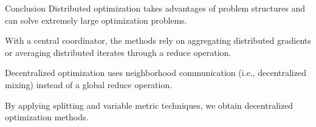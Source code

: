 \documentclass[10pt,mathserif]{beamer}
\begin{document}
\iffalse
\begin{frame}
\frametitle{DIGing}
Let $\overline{W}\in \reals^{n\times n}$ be a mixing matrix. The method
\begin{align*}
  \vx^{k+1} & = \overline{W}\vx^k - \vz^k \\
  \vz^{k+1} & = \overline{W}\vz^k + \alpha\left(\nabla h(\vx^k) - \nabla h(\vx^{k-1})\right),
\end{align*}
is called DIGing.
DIGing is a special case of PG-EXTRA with $f=0$, $\beta=1$,  $W=2\overline{W}-I$, and $\widetilde{W}= \overline{W}\overline{W}$.

The $\vx$ update is similar to DGD \eqref{eq:dgd_itr} where $\alpha\nabla h(\vx^k)$ is replaced by $\vz^k$.
Comparing the $\vz$ update to that in Exercise \ref{exercise:tracking_in_network}, we can see $\vz^k$ trails the mean $\frac{1}{n}\sum_{i=1}^{n}\nabla h_i(x_i^k)$. Show that
{\color{red} QUESTION TO WOTAO: What does ``trail'' mean?}{\color{blue} ``track'' is a better word.}
\begin{enumerate}
  \item If $\vx^k\to\bar{\vx}$ and $\vz^k\to \frac{1}{n}\sum_{i=1}^{n}\nabla h_i(\bar{x}_i)$ for some $\bar{\vx}$, then $\bar{\vx}$ is a solution to \eqref{eq:cons_basic_h_prob};
  \item Show that DIGing is a special case of EXTRA. (Hint: let $W=2\overline{W}-I$ and $\widetilde{W}= \overline{W}\overline{W}$.)
\end{enumerate}
Therefore, if $\overline{W}$ and $\alpha$ are chosen such that the equivalent setup of EXTRA converges to a solution of \eqref{eq:cons_f_g_prob}, DIGing also does.
XXX
\end{frame}

\fi 

\begin{frame}{Conclusion}
  Distributed optimization takes advantages of problem structures and can solve extremely large optimization problems.
  \bigskip
  
  With a central coordinator, the methods rely on aggregating distributed gradients or averaging distributed iterates through a reduce operation.
  \bigskip
  
  Decentralized optimization uses neighborhood communication (i.e., decentralized mixing) instead of a global reduce operation.
  \bigskip

  By applying splitting and variable metric techniques, we obtain decentralized optimization methods.
\end{frame}
\end{document}

